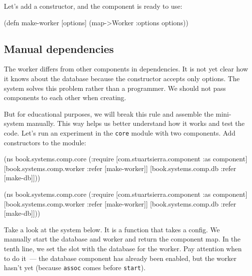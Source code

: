 \fi

\noindent
Let's add a constructor, and the component is ready to use:


\begin{english}
  \begin{clojure}
(defn make-worker
  [options]
  (map->Worker {:options options}))
  \end{clojure}
\end{english}

\subsection{Manual dependencies}


The worker differs from other components in dependencies. It is not yet clear how it knows about the database because the constructor accepts only options. The system solves this problem rather than a programmer. We should not pass components to each other when creating.

But for educational purposes, we will break this rule and assemble the mini-system manually. This way helps us better understand how it works and test the code. Let's run an experiment in the \verb|core| module with two components. Add constructors to the module:

\ifnarrow

\begin{english}
  \begin{clojure}
(ns book.systems.comp.core
  (:require
   [com.stuartsierra.component
    :as component]
   [book.systems.comp.worker
    :refer [make-worker]]
   [book.systems.comp.db
    :refer [make-db]]))
  \end{clojure}
\end{english}

\else

\begin{english}
  \begin{clojure}
(ns book.systems.comp.core
  (:require
   [com.stuartsierra.component :as component]
   [book.systems.comp.worker :refer [make-worker]]
   [book.systems.comp.db :refer [make-db]]))
  \end{clojure}
\end{english}

\fi

Take a look at the system below. It is a function that takes a config. We manually start the database and worker and return the component map. In the tenth line, we set the slot with the database for the worker.
Pay attention when to do it~--- the database component has already been enabled, but the worker hasn't yet (because \verb|assoc| comes before \verb|start|).

